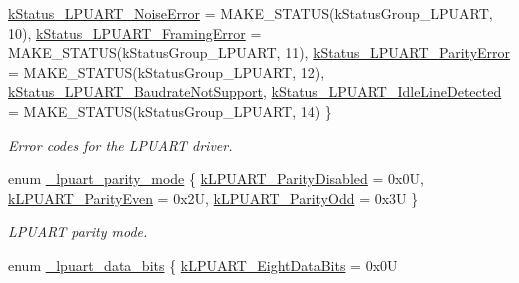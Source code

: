 \begin{DoxyCompactItemize}
\mbox{\hyperlink{group__lpuart__driver_gga157d5577a5b2f5986037d0d09c7dc77da6ccebae2eb859fde044f15f1dd18cba1}{k\+Status\+\_\+\+L\+P\+U\+A\+R\+T\+\_\+\+Noise\+Error}} = M\+A\+K\+E\+\_\+\+S\+T\+A\+T\+US(k\+Status\+Group\+\_\+\+L\+P\+U\+A\+RT, 10), 
\mbox{\hyperlink{group__lpuart__driver_gga157d5577a5b2f5986037d0d09c7dc77da1528dc2aacb3a792a1ecbfbbc7941bc9}{k\+Status\+\_\+\+L\+P\+U\+A\+R\+T\+\_\+\+Framing\+Error}} = M\+A\+K\+E\+\_\+\+S\+T\+A\+T\+US(k\+Status\+Group\+\_\+\+L\+P\+U\+A\+RT, 11), 
\newline
\mbox{\hyperlink{group__lpuart__driver_gga157d5577a5b2f5986037d0d09c7dc77dad42bcd27cb6e04725768c6b98d4cbe0d}{k\+Status\+\_\+\+L\+P\+U\+A\+R\+T\+\_\+\+Parity\+Error}} = M\+A\+K\+E\+\_\+\+S\+T\+A\+T\+US(k\+Status\+Group\+\_\+\+L\+P\+U\+A\+RT, 12), 
\mbox{\hyperlink{group__lpuart__driver_gga157d5577a5b2f5986037d0d09c7dc77daaa020183f56b7d7f63e22fd5fd8d3df2}{k\+Status\+\_\+\+L\+P\+U\+A\+R\+T\+\_\+\+Baudrate\+Not\+Support}}, 
\mbox{\hyperlink{group__lpuart__driver_gga157d5577a5b2f5986037d0d09c7dc77da29540bf056281514eb42c8885f7e2e10}{k\+Status\+\_\+\+L\+P\+U\+A\+R\+T\+\_\+\+Idle\+Line\+Detected}} = M\+A\+K\+E\+\_\+\+S\+T\+A\+T\+US(k\+Status\+Group\+\_\+\+L\+P\+U\+A\+RT, 14)
 \}
\begin{DoxyCompactList}\small\item\em Error codes for the L\+P\+U\+A\+RT driver. \end{DoxyCompactList}\item 
enum \mbox{\hyperlink{group__lpuart__driver_ga22a746cfd0fffff30eaf27f8795b2059}{\+\_\+lpuart\+\_\+parity\+\_\+mode}} \{ \mbox{\hyperlink{group__lpuart__driver_gga22a746cfd0fffff30eaf27f8795b2059a0e5bdb8fc4e1010930d05e1490a75b1a}{k\+L\+P\+U\+A\+R\+T\+\_\+\+Parity\+Disabled}} = 0x0U, 
\mbox{\hyperlink{group__lpuart__driver_gga22a746cfd0fffff30eaf27f8795b2059ac92adb3fdf11240ca5dee6c6543b6ff7}{k\+L\+P\+U\+A\+R\+T\+\_\+\+Parity\+Even}} = 0x2U, 
\mbox{\hyperlink{group__lpuart__driver_gga22a746cfd0fffff30eaf27f8795b2059adab63856e98e0715f4ab289ac0da3575}{k\+L\+P\+U\+A\+R\+T\+\_\+\+Parity\+Odd}} = 0x3U
 \}
\begin{DoxyCompactList}\small\item\em L\+P\+U\+A\+RT parity mode. \end{DoxyCompactList}\item 
enum \mbox{\hyperlink{group__lpuart__driver_ga565561e02414c90014f13391a1dd7dd5}{\+\_\+lpuart\+\_\+data\+\_\+bits}} \{ \mbox{\hyperlink{group__lpuart__driver_gga565561e02414c90014f13391a1dd7dd5aaa10fe51f0b83d5c0a2e060dab983899}{k\+L\+P\+U\+A\+R\+T\+\_\+\+Eight\+Data\+Bits}} = 0x0U

\end{DoxyCompactItemize}
